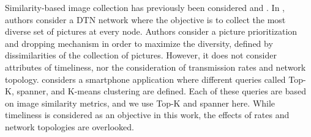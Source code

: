 Similarity-based image collection has previously been considered \cite{photonet} and \cite{mediascope}. In \cite{photonet}, authors consider a DTN network where the objective is to collect the most diverse set of pictures at every node.  Authors consider a picture prioritization and dropping mechanism in order to maximize the diversity, defined by dissimilarities of the collection of pictures. However, it does not consider attributes of timeliness, nor the consideration of transmission rates and network topology.  \cite{mediascope} considers a smartphone application where different queries called Top-K, spanner, and K-means clustering are defined.  Each of these queries are based on image similarity metrics, and we use Top-K and spanner here. While timeliness is considered as an objective in this work, the effects of rates and network topologies are overlooked.

